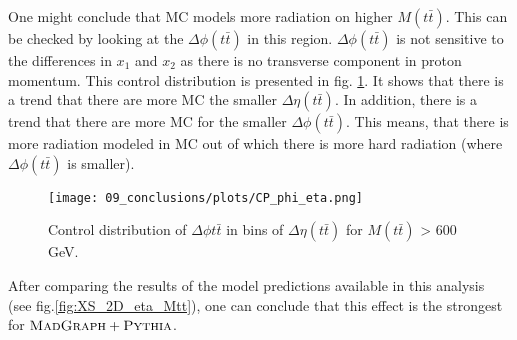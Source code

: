 One might conclude that MC models more radiation on higher $M(t\bar{t})$. This can be checked by looking at the $\Delta\phi(t\bar{t})$ in this region.
$\Delta\phi(t\bar{t})$ is not sensitive to the differences in $x_{1}$ and $x_{2}$ as there is no transverse component in proton momentum.
This control distribution is presented in fig. \ref{fig:CP_phi_eta}. It shows that there is a trend that there are more MC the smaller $\Delta\eta(t\bar{t})$.
In addition, there is a trend that there are more MC for the smaller $\Delta\phi(t\bar{t})$. This means, that there is more radiation modeled
in MC out of which there is more hard radiation (where $\Delta\phi(t\bar{t})$ is smaller).

\begin{figure}[t]
  \centering
  \texttt{[image: 09\_conclusions/plots/CP\_phi\_eta.png]}
  \caption{Control distribution of $\Delta\phi{t\bar{t}}$ in bins of $\Delta\eta(t\bar{t})$ for $M(t\bar{t})$ > 600 GeV.}
  \label{fig:CP_phi_eta}
\end{figure}

After comparing the results of the model predictions available in this analysis (see fig.\ref{fig:XS_2D_eta_Mtt}), one can conclude that this effect is the
strongest for $\textsc{MadGraph}+\textsc{Pythia}$.